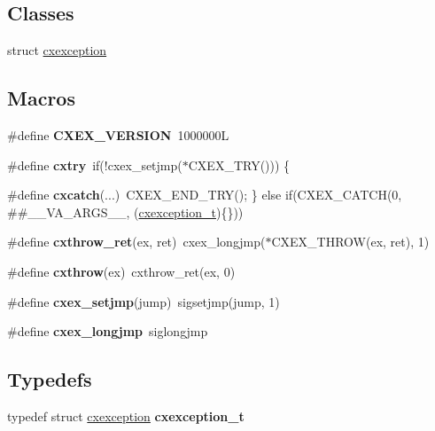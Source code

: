 \subsection*{Classes}
\begin{DoxyCompactItemize}
\item 
struct \hyperlink{a00048}{cxexception}
\end{DoxyCompactItemize}
\subsection*{Macros}
\begin{DoxyCompactItemize}
\item 
\mbox{\label{a00011_a099d212cb0554607ddc5f97f459108f8}} 
\#define {\bfseries C\+X\+E\+X\+\_\+\+V\+E\+R\+S\+I\+ON}~1000000L
\item 
\mbox{\label{a00011_a07394dfadb1e836bb044fd133a0b5fdc}} 
\#define {\bfseries cxtry}~if(!cxex\+\_\+setjmp($\ast$C\+X\+E\+X\+\_\+\+T\+RY())) \{
\item 
\mbox{\label{a00011_a5d2ea9622f3bd15d8e8489663e04b11b}} 
\#define {\bfseries cxcatch}(...)~C\+X\+E\+X\+\_\+\+E\+N\+D\+\_\+\+T\+RY(); \} else if(C\+X\+E\+X\+\_\+\+C\+A\+T\+CH(0, \#\#\+\_\+\+\_\+\+V\+A\+\_\+\+A\+R\+G\+S\+\_\+\+\_\+, (\hyperlink{a00048}{cxexception\+\_\+t})\{\}))
\item 
\mbox{\label{a00011_a6eb910a21c7df5cfaef2b0283101205d}} 
\#define {\bfseries cxthrow\+\_\+ret}(ex,  ret)~cxex\+\_\+longjmp($\ast$C\+X\+E\+X\+\_\+\+T\+H\+R\+OW(ex, ret), 1)
\item 
\mbox{\label{a00011_a868460d46c56b694c6aa3f18464c9c4d}} 
\#define {\bfseries cxthrow}(ex)~cxthrow\+\_\+ret(ex, 0)
\item 
\mbox{\label{a00011_aaac72ecb8338617ac54c2e50334d92ef}} 
\#define {\bfseries cxex\+\_\+setjmp}(jump)~sigsetjmp(jump, 1)
\item 
\mbox{\label{a00011_a4ec477263777d3fa887e5451b3ec14f5}} 
\#define {\bfseries cxex\+\_\+longjmp}~siglongjmp
\end{DoxyCompactItemize}
\subsection*{Typedefs}
\begin{DoxyCompactItemize}
\item 
\mbox{\label{a00011_a6a643c4c3fe776c4e158afba6ac87c7a}} 
typedef struct \hyperlink{a00048}{cxexception} {\bfseries cxexception\+\_\+t}
\end{DoxyCompactItemize}
